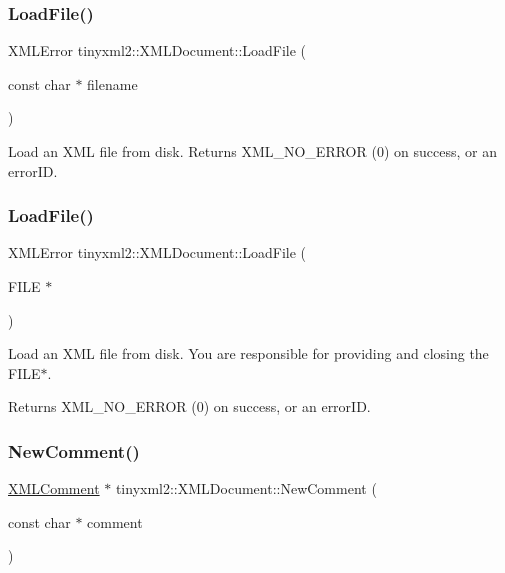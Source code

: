 \subsubsection{\texorpdfstring{Load\+File()}{LoadFile()}\hspace{0.1cm}{\footnotesize\ttfamily [3/4]}}
{\footnotesize\ttfamily X\+M\+L\+Error tinyxml2\+::\+X\+M\+L\+Document\+::\+Load\+File (\begin{DoxyParamCaption}\item[{const char $\ast$}]{filename }\end{DoxyParamCaption})}

Load an X\+ML file from disk. Returns X\+M\+L\+\_\+\+N\+O\+\_\+\+E\+R\+R\+OR (0) on success, or an error\+ID. \mbox{\label{classtinyxml2_1_1XMLDocument_a5f1d330fad44c52f3d265338dd2a6dc2}} 
\subsubsection{\texorpdfstring{Load\+File()}{LoadFile()}\hspace{0.1cm}{\footnotesize\ttfamily [4/4]}}
{\footnotesize\ttfamily X\+M\+L\+Error tinyxml2\+::\+X\+M\+L\+Document\+::\+Load\+File (\begin{DoxyParamCaption}\item[{F\+I\+LE $\ast$}]{ }\end{DoxyParamCaption})}

Load an X\+ML file from disk. You are responsible for providing and closing the F\+I\+L\+E$\ast$.

Returns X\+M\+L\+\_\+\+N\+O\+\_\+\+E\+R\+R\+OR (0) on success, or an error\+ID. \mbox{\label{classtinyxml2_1_1XMLDocument_a386df0befd06aadb5e0cd21381aa955a}} 
\subsubsection{\texorpdfstring{New\+Comment()}{NewComment()}\hspace{0.1cm}{\footnotesize\ttfamily [1/2]}}
{\footnotesize\ttfamily \hyperlink{classtinyxml2_1_1XMLComment}{X\+M\+L\+Comment} $\ast$ tinyxml2\+::\+X\+M\+L\+Document\+::\+New\+Comment (\begin{DoxyParamCaption}\item[{const char $\ast$}]{comment }\end{DoxyParamCaption})}

